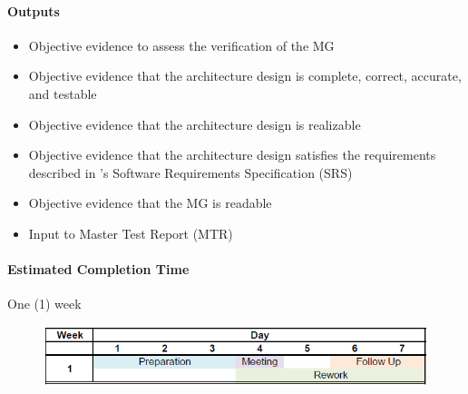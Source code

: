 \paragraph{Outputs}
\begin{itemize}

    \item Objective evidence to assess the verification of the MG

    \item Objective evidence that the architecture design is complete, correct,
    accurate, and testable

    \item Objective evidence that the architecture design is realizable

    \item Objective evidence that the architecture design satisfies the
    requirements described in \progname{}'s Software Requirements Specification
    (SRS)

    \item Objective evidence that the MG is readable

    \item Input to Master Test Report (MTR)

\end{itemize}

\paragraph{Estimated Completion Time} One (1) week

\begin{figure}[!h]
    \centering
    \includegraphics[width=0.9\linewidth]{figures/MG_Schedule.png}
\end{figure}